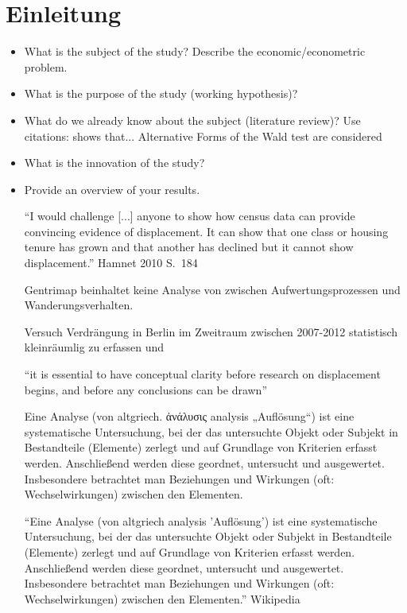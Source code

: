 \section{Einleitung}

\begin{itemize}

    \item What is the subject of the study? Describe the
        economic/econometric problem.
    \item What is the purpose of the study (working hypothesis)?
    \item What do we already know about the subject (literature
        review)? Use citations: shows that...
        Alternative Forms of the Wald test are considered
    \item What is the innovation of the study?
    \item Provide an overview of your results.
    
"`I would challenge [...] anyone to show how census data can provide convincing evidence of displacement. It can show that one class or housing tenure has grown and that another has declined but it cannot show displacement."' Hamnet 2010 S.~184

Gentrimap beinhaltet keine Analyse von zwischen Aufwertungsprozessen und Wanderungsverhalten.

Versuch Verdrängung in Berlin im Zweitraum zwischen 2007-2012 statistisch kleinräumlig zu erfassen und 


"`it is essential to have conceptual clarity before research on displacement begins, and before any conclusions can be drawn"' \citet[S.~304]{Slater2009}

Eine Analyse (von altgriech. ἀνάλυσις analysis „Auflösung“) ist eine systematische Untersuchung, bei der das untersuchte Objekt oder Subjekt in Bestandteile (Elemente) zerlegt und auf Grundlage von Kriterien erfasst werden. Anschließend werden diese geordnet, untersucht und ausgewertet. Insbesondere betrachtet man Beziehungen und Wirkungen (oft: Wechselwirkungen) zwischen den Elementen.

"`Eine Analyse (von altgriech analysis 'Auflösung') ist eine systematische Untersuchung, bei der das untersuchte Objekt oder Subjekt in Bestandteile (Elemente) zerlegt und auf Grundlage von Kriterien erfasst werden. Anschließend werden diese geordnet, untersucht und ausgewertet. Insbesondere betrachtet man Beziehungen und Wirkungen (oft: Wechselwirkungen) zwischen den Elementen."' Wikipedia



\end{itemize}
